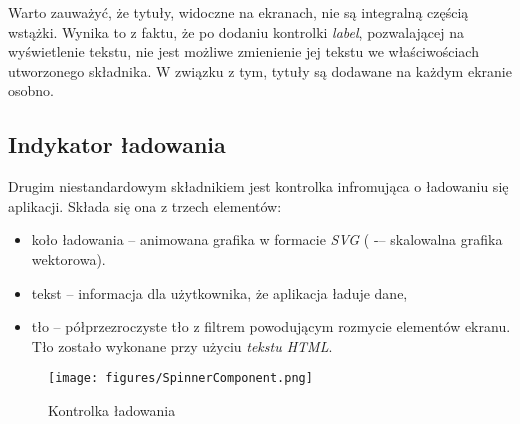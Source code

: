 Warto zauważyć, że tytuły, widoczne na ekranach, nie są integralną częścią wstążki. Wynika to z faktu, że po dodaniu kontrolki \emph{label}, pozwalającej na wyświetlenie tekstu, nie jest możliwe zmienienie jej tekstu we właściwościach utworzonego składnika. W związku z tym, tytuły są dodawane na każdym ekranie osobno.


\subsection{Indykator ładowania}
Drugim niestandardowym składnikiem jest kontrolka infromująca o ładowaniu się aplikacji. Składa się ona z trzech elementów:
\begin{itemize}
    \item koło ładowania -- animowana grafika w formacie \emph{SVG} ( -– skalowalna grafika wektorowa).
    \item tekst -- informacja dla użytkownika, że aplikacja ładuje dane,
    \item tło -- półprzezroczyste tło z filtrem powodującym rozmycie elementów ekranu. Tło zostało wykonane przy użyciu \emph{tekstu HTML}.
\end{itemize}

\begin{figure}[H]
    \centering
    \texttt{[image: figures/SpinnerComponent.png]}
    \caption{Kontrolka ładowania}
    \label{fig:spinnercomponent}
\end{figure}

